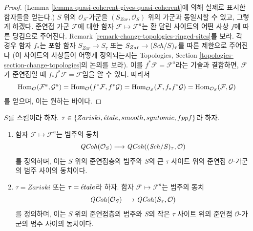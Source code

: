 \begin{proof}
(Lemma \ref{lemma-quasi-coherent-gives-quasi-coherent}에 의해 실제로
표시한 함자들을 얻는다.) $S$ 위의 $\mathcal{O}_S$-가군을
$(S_{Zar}, \mathcal{O}_S)$ 위의 가군과 동일시할 수 있고, 그렇게 하겠다.
준연접 가군 $\mathcal{F}$에 대한 함자
$\mathcal{F} \mapsto \mathcal{F}^a$는 환 달린 사이트의 어떤 사상
$f$에 따른 당김으로 주어진다. Remark
\ref{remark-change-topologies-ringed-sites}를 보라. 각 경우 함자 $f_*$는
포함 함자 $S_{Zar} \to S_\tau$ 또는
$S_{Zar} \to (\mathit{Sch}/S)_\tau$를 따른 제한으로 주어진다
(이 사이트의 사상들이 어떻게 정의되는지는 Topologies, Section
\ref{topologies-section-change-topologies}의 논의를 보라).
이를 $f^*\mathcal{F} = \mathcal{F}^a$라는 기술과 결합하면,
$\mathcal{F}$가 준연접일 때 $f_*f^*\mathcal{F} = \mathcal{F}$임을 알 수 있다.
따라서
$$
\mathop{\mathrm{Hom}}\nolimits_\mathcal{O}(\mathcal{F}^a, \mathcal{G}^a) =
\mathop{\mathrm{Hom}}\nolimits_\mathcal{O}(f^*\mathcal{F}, f^*\mathcal{G}) =
\mathop{\mathrm{Hom}}\nolimits_{\mathcal{O}_S}(\mathcal{F}, f_*f^*\mathcal{G}) =
\mathop{\mathrm{Hom}}\nolimits_{\mathcal{O}_S}(\mathcal{F}, \mathcal{G})
$$
를 얻으며, 이는 원하는 바이다.
\end{proof}

\begin{proposition}
\label{proposition-equivalence-quasi-coherent}
$S$를 스킴이라 하자.
$\tau \in \{Zariski, \linebreak[0] \etale, \linebreak[0]
smooth, \linebreak[0] syntomic, \linebreak[0] fppf\}$라 하자.
\begin{enumerate}
\item 함자 $\mathcal{F} \mapsto \mathcal{F}^a$는 범주의 동치
$$
\mathit{QCoh}(\mathcal{O}_S)
\longrightarrow
\mathit{QCoh}((\mathit{Sch}/S)_\tau, \mathcal{O})
$$
를 정의하며, 이는 $S$ 위의 준연접층의 범주와 $S$의 큰 $\tau$ 사이트
위의 준연접 $\mathcal{O}$-가군의 범주 사이의 동치이다.
\item $\tau = Zariski$ 또는 $\tau = {\acute{e}tale}$라 하자.
함자 $\mathcal{F} \mapsto \mathcal{F}^a$는 범주의 동치
$$
\mathit{QCoh}(\mathcal{O}_S)
\longrightarrow
\mathit{QCoh}(S_\tau, \mathcal{O})
$$
를 정의하며, 이는 $S$ 위의 준연접층의 범주와 $S$의 작은 $\tau$ 사이트
위의 준연접 $\mathcal{O}$-가군의 범주 사이의 동치이다.
\end{enumerate}
\end{proposition}


